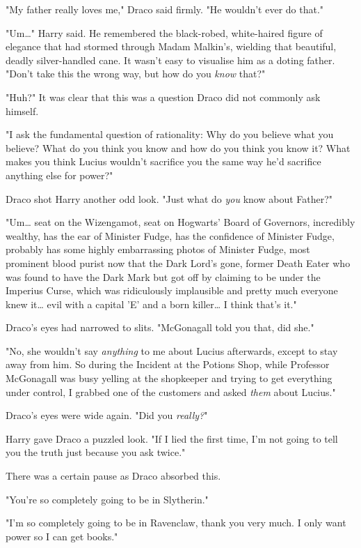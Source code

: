"My father really loves me," Draco said firmly. "He wouldn't ever do that."

"Um{\ldots}" Harry said. He remembered the black-robed, white-haired figure of 
elegance that had stormed through Madam Malkin's, wielding that beautiful, 
deadly silver-handled cane. It wasn't easy to visualise him as a doting father. 
"Don't take this the wrong way, but how do you \emph{know} that?"

"Huh?" It was clear that this was a question Draco did not commonly ask himself.

"I ask the fundamental question of rationality: Why do you believe what you 
believe? What do you think you know and how do you think you know it? What 
makes you think Lucius wouldn't sacrifice you the same way he'd sacrifice 
anything else for power?"

Draco shot Harry another odd look. "Just what do \emph{you} know about Father?"

"Um{\ldots} seat on the Wizengamot, seat on Hogwarts' Board of Governors, 
incredibly wealthy, has the ear of Minister Fudge, has the confidence of 
Minister Fudge, probably has some highly embarrassing photos of Minister Fudge, 
most prominent blood purist now that the Dark Lord's gone, former Death Eater 
who was found to have the Dark Mark but got off by claiming to be under the 
Imperius Curse, which was ridiculously implausible and pretty much everyone 
knew it{\ldots} evil with a capital 'E' and a born killer{\ldots} I think 
that's it."

Draco's eyes had narrowed to slits. "McGonagall told you that, did she."

"No, she wouldn't say \emph{anything} to me about Lucius afterwards, except to 
stay away from him. So during the Incident at the Potions Shop, while Professor 
McGonagall was busy yelling at the shopkeeper and trying to get everything 
under control, I grabbed one of the customers and asked \emph{them} about 
Lucius."

Draco's eyes were wide again. "Did you \emph{really?}"

Harry gave Draco a puzzled look. "If I lied the first time, I'm not going to 
tell you the truth just because you ask twice."

There was a certain pause as Draco absorbed this.

"You're so completely going to be in Slytherin."

"I'm so completely going to be in Ravenclaw, thank you very much. I only want 
power so I can get books."

